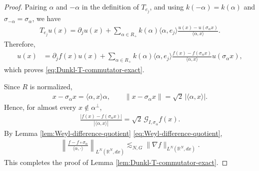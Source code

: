 \documentclass{amsart}
\begin{document}
\begin{proof}
Pairing \(\alpha\) and \(-\alpha\) in the definition of \(T_{e_j}\), and using \(k(-\alpha)=k(\alpha)\) and \(\sigma_{-\alpha}=\sigma_\alpha\), we have
\begin{align*}
T_{e_j}u(x)
=
\partial_j u(x)
+
\sum_{\alpha\in R_+}
k(\alpha)\langle\alpha,e_j\rangle
\frac{u(x)-u(\sigma_\alpha x)}
{\langle\alpha,x\rangle}.
\end{align*}
Therefore,
\begin{align*}
[T_{e_j},M_f]u(x)
&=
\partial_jf(x)u(x)
+
\sum_{\alpha\in R_+}
k(\alpha)\langle\alpha,e_j\rangle
\frac{f(x)-f(\sigma_\alpha x)}
{\langle\alpha,x\rangle}
u(\sigma_\alpha x),
\end{align*}
which proves \eqref{eq:Dunkl-T-commutator-exact}.

Since \(R\) is normalized,
\begin{align*}
x-\sigma_\alpha x
=
\langle\alpha,x\rangle\alpha,
\qquad
\|x-\sigma_\alpha x\|
=
\sqrt{2}\,|\langle\alpha,x\rangle|.
\end{align*}
Hence, for almost every \(x\notin\alpha^\perp\),
\begin{align*}
\frac{|f(x)-f(\sigma_\alpha x)|}
{|\langle\alpha,x\rangle|}
=
\sqrt{2}\,
\mathcal G_{I,\sigma_\alpha}f(x).
\end{align*}
By Lemma \ref{lem:Weyl-difference-quotient} \eqref{eq:Weyl-difference-quotient},
\begin{align*}
\left\|
\frac{f-f\circ\sigma_\alpha}
{\langle\alpha,\cdot\rangle}
\right\|_{L^N(\mathbb R^N,dx)}
\lesssim_{N,G}
\|\nabla f\|_{L^N(\mathbb R^N,dx)}.
\end{align*}
This completes the proof of Lemma \ref{lem:Dunkl-T-commutator-exact}.
\end{proof}
\end{document}

